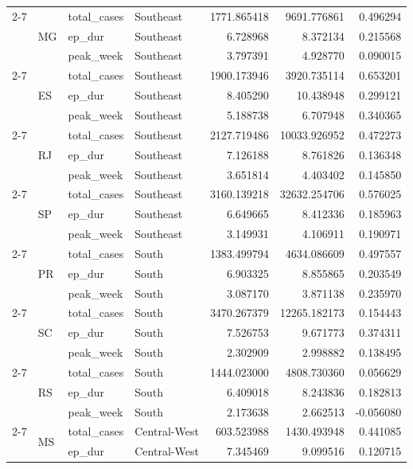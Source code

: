 \documentclass{report}
\begin{document}
\begin{center}
\begin{center}
\begin{longtable}{llllrrr}
\cline{2-7}
 & \multirow[t]{3}{*}{MG} & total\_cases & Southeast & 1771.865418 & 9691.776861 & 0.496294 \\
 &  & ep\_dur & Southeast & 6.728968 & 8.372134 & 0.215568 \\
 &  & peak\_week & Southeast & 3.797391 & 4.928770 & 0.090015 \\
\cline{2-7}
 & \multirow[t]{3}{*}{ES} & total\_cases & Southeast & 1900.173946 & 3920.735114 & 0.653201 \\
 &  & ep\_dur & Southeast & 8.405290 & 10.438948 & 0.299121 \\
 &  & peak\_week & Southeast & 5.188738 & 6.707948 & 0.340365 \\
\cline{2-7}
 & \multirow[t]{3}{*}{RJ} & total\_cases & Southeast & 2127.719486 & 10033.926952 & 0.472273 \\
 &  & ep\_dur & Southeast & 7.126188 & 8.761826 & 0.136348 \\
 &  & peak\_week & Southeast & 3.651814 & 4.403402 & 0.145850 \\
\cline{2-7}
 & \multirow[t]{3}{*}{SP} & total\_cases & Southeast & 3160.139218 & 32632.254706 & 0.576025 \\
 &  & ep\_dur & Southeast & 6.649665 & 8.412336 & 0.185963 \\
 &  & peak\_week & Southeast & 3.149931 & 4.106911 & 0.190971 \\
\cline{2-7}
 & \multirow[t]{3}{*}{PR} & total\_cases & South & 1383.499794 & 4634.086609 & 0.497557 \\
 &  & ep\_dur & South & 6.903325 & 8.855865 & 0.203549 \\
 &  & peak\_week & South & 3.087170 & 3.871138 & 0.235970 \\
\cline{2-7}
 & \multirow[t]{3}{*}{SC} & total\_cases & South & 3470.267379 & 12265.182173 & 0.154443 \\
 &  & ep\_dur & South & 7.526753 & 9.671773 & 0.374311 \\
 &  & peak\_week & South & 2.302909 & 2.998882 & 0.138495 \\
\cline{2-7}
 & \multirow[t]{3}{*}{RS} & total\_cases & South & 1444.023000 & 4808.730360 & 0.056629 \\
 &  & ep\_dur & South & 6.409018 & 8.243836 & 0.182813 \\
 &  & peak\_week & South & 2.173638 & 2.662513 & -0.056080 \\
\cline{2-7}
 & \multirow[t]{3}{*}{MS} & total\_cases & Central-West & 603.523988 & 1430.493948 & 0.441085 \\
 &  & ep\_dur & Central-West & 7.345469 & 9.099516 & 0.120715 \\

\end{longtable}
\end{center}
\end{center}
\end{document}
